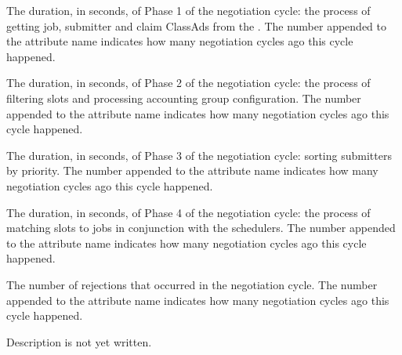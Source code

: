 \begin{description}
\label{attr:LastNegotiationCyclePhase1Duration<X>}
\item[\AdAttr{LastNegotiationCyclePhase1Duration<X>}:] 
The duration, in seconds, of Phase 1 of the negotiation cycle: 
the process of getting job, submitter and claim ClassAds from the 
.
The number  appended to the attribute name indicates 
how many negotiation cycles ago this cycle happened.

\label{attr:LastNegotiationCyclePhase2Duration<X>}
\item[\AdAttr{LastNegotiationCyclePhase2Duration<X>}:] 
The duration, in seconds, of Phase 2 of the negotiation cycle: 
the process of filtering slots and processing accounting group configuration. 
The number  appended to the attribute name indicates 
how many negotiation cycles ago this cycle happened.

\label{attr:LastNegotiationCyclePhase3Duration<X>}
\item[\AdAttr{LastNegotiationCyclePhase3Duration<X>}:] 
The duration, in seconds, of Phase 3 of the negotiation cycle: 
sorting submitters by priority.  
The number  appended to the attribute name indicates 
how many negotiation cycles ago this cycle happened.

\label{attr:LastNegotiationCyclePhase4Duration<X>}
\item[\AdAttr{LastNegotiationCyclePhase4Duration<X>}:] 
The duration, in seconds, of Phase 4 of the negotiation cycle: 
the process of matching slots to jobs in conjunction with the schedulers. 
The number  appended to the attribute name indicates 
how many negotiation cycles ago this cycle happened.

\label{attr:LastNegotiationCycleRejections<X>}
\item[\AdAttr{LastNegotiationCycleRejections<X>}:] The number of
rejections that occurred in the negotiation cycle.  The number 
appended to the attribute name indicates how many negotiation cycles
ago this cycle happened.

\label{attr:LastNegotiationCycleSlotShareIter}
\item[\AdAttr{LastNegotiationCycleSlotShareIter}:] 
Description is not yet written.


\end{description}
